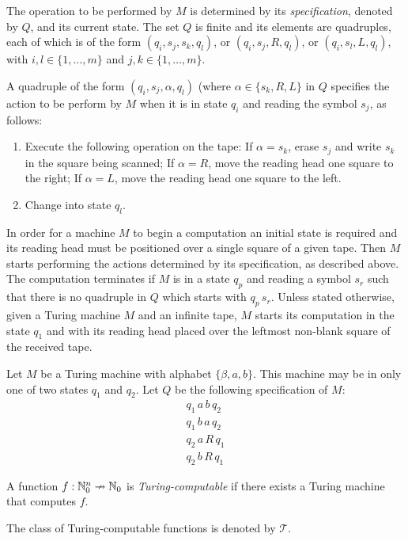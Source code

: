 The operation to be performed by $M$ is determined by its \emph{specification}, denoted by $Q$, and its current state. The set $Q$ is finite and its elements are quadruples, each of which is of the form $(q_i, s_j, s_k, q_l)$, or $(q_i, s_j, R, q_l)$, or $(q_i, s_l, L, q_l)$, with $i,l \in \{ 1, \ldots, m \}$ and $j,k \in \{ 1, \ldots, m \}$. \par
A quadruple of the form $(q_i, s_j, \alpha, q_l)$ (where $\alpha \in \{ s_k , R, L \}$ in $Q$ specifies the action to be perform by $M$ when it is in state $q_i$ and reading the symbol $s_j$, as follows:
\begin{enumerate}
	\item Execute the following operation on the tape:
		\subitem If $\alpha = s_k$, erase $s_j$ and write $s_k$ in the square being scanned;
		\subitem If $\alpha = R$, move the reading head one square to the right;
		\subitem If $\alpha = L$, move the reading head one square to the left.
	\item Change into state $q_l$.
\end{enumerate}
In order for a machine $M$ to begin a computation an initial state is required and its reading head must be positioned over a single square of a given tape. Then $M$ starts performing the actions determined by its specification, as described above. The computation terminates if $M$ is in a state $q_p$ and reading a symbol $s_r$ such that there is no quadruple in $Q$ which starts with $q_p \, s_r$. Unless stated otherwise, given a Turing machine $M$ and an infinite tape, $M$ starts its computation in the state $q_1$ and with its reading head placed over the leftmost non-blank square of the received tape.

\begin{example}
	Let $M$ be a Turing machine with alphabet $\{ \beta, a , b \}$. This machine may be in only one of two states $q_1$ and $q_2$. Let $Q$ be the following specification of $M$:
	\begin{gather*}	
	q_1 \, a \, b \, q_2 \\
	q_1 \, b \, a \, q_2 \\
	q_2 \, a \, R \, q_1 \\
	q_2 \, b \, R \, q_1
	\end{gather*}
\end{example}

\begin{definition}
	A function $f: \mathbb{N}_0^n \nrightarrow \mathbb{N}_0$ is \emph{Turing-computable} if there exists a Turing machine that computes $f$. 
\end{definition}
The class of Turing-computable functions is denoted by $\mathcal{T}$.


